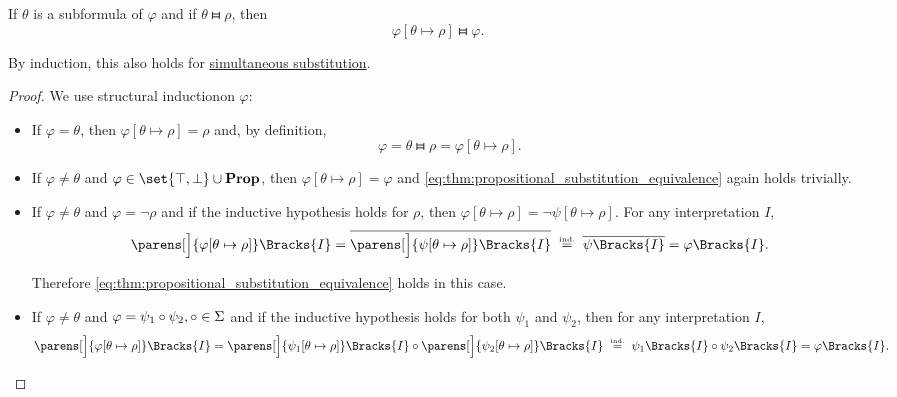\begin{proposition}\label{thm:propositional_substitution_equivalence}
  If \( \theta \) is a subformula of \( \varphi \) and if \( \theta \gleichstark \rho \), then
  \begin{equation}\label{eq:thm:propositional_substitution_equivalence}
    \varphi[\theta \mapsto \rho] \gleichstark \varphi.
  \end{equation}

  By induction, this also holds for \hyperref[def:propositional_substitution/simultaneous]{simultaneous substitution}.
\end{proposition}
\begin{proof}
  We use structural induction\IND on \( \varphi \):

  \begin{itemize}
    \item If \( \varphi = \theta \), then \( \varphi[\theta \mapsto \rho] = \rho \) and, by definition,
    \begin{equation*}
      \varphi = \theta \gleichstark \rho = \varphi[\theta \mapsto \rho].
    \end{equation*}

    \item If \( \varphi \neq \theta \) and \( \varphi \in \set{ \top, \bot } \cup \boldop{Prop} \), then \( \varphi[\theta \mapsto \rho] = \varphi \) and \eqref{eq:thm:propositional_substitution_equivalence} again holds trivially.

    \item If \( \varphi \neq \theta \) and \( \varphi = \neg \rho \) and if the inductive hypothesis holds for \( \rho \), then \( \varphi[\theta \mapsto \rho] = \neg \psi[\theta \mapsto \rho] \). For any interpretation \( I \),
    \begin{equation*}
      \parens[\Big]{ \varphi[\theta \mapsto \rho] }\Bracks{I}
      =
      \overline{\parens[\Big]{ \psi[\theta \mapsto \rho] }\Bracks{I}}
      \reloset {\T{ind.}} =
      \overline{\psi\Bracks{I}}
      =
      \varphi\Bracks{I}.
    \end{equation*}

    Therefore \eqref{eq:thm:propositional_substitution_equivalence} holds in this case.

    \item If \( \varphi \neq \theta \) and \( \varphi = \psi_1 \mathbin \circ \psi_2, \mathbin \circ \in \Sigma \) and if the inductive hypothesis holds for both \( \psi_1 \) and \( \psi_2 \), then for any interpretation \( I \),
    \begin{equation*}
      \parens[\Big]{ \varphi[\theta \mapsto \rho] }\Bracks{I}
      =
      \parens[\Big]{ \psi_1[\theta \mapsto \rho] }\Bracks{I} \bincirc \parens[\Big]{ \psi_2[\theta \mapsto \rho] }\Bracks{I}
      \reloset {\T{ind.}} =
      \psi_1\Bracks{I} \bincirc \psi_2\Bracks{I}
      =
      \varphi\Bracks{I}.
    \end{equation*}


\end{itemize}
\end{proof}
